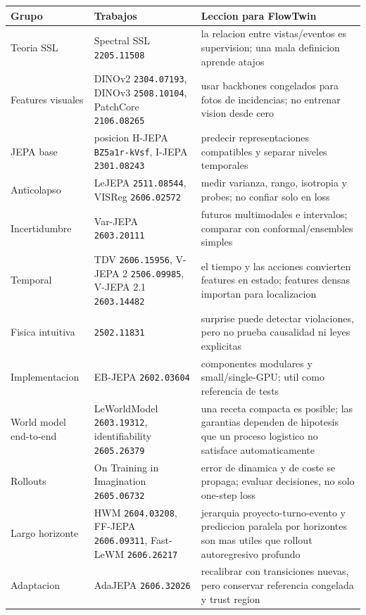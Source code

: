 \documentclass[
  spanish,
  10pt,
  a4paper,
]{article}
\newcounter{none} %
\begin{document}
{\def\LTcaptype{none} %
\begin{longtable}[]{@{}lll@{}}
\toprule\noalign{}
Grupo & Trabajos & Leccion para FlowTwin \\
\midrule\noalign{}
\endhead
\bottomrule\noalign{}
\endlastfoot
Teoria SSL & Spectral SSL \texttt{2205.11508} & la relacion entre
vistas/eventos es supervision; una mala definicion aprende atajos \\
Features visuales & DINOv2 \texttt{2304.07193}, DINOv3
\texttt{2508.10104}, PatchCore \texttt{2106.08265} & usar backbones
congelados para fotos de incidencias; no entrenar vision desde cero \\
JEPA base & posicion H-JEPA \texttt{BZ5a1r-kVsf}, I-JEPA
\texttt{2301.08243} & predecir representaciones compatibles y separar
niveles temporales \\
Anticolapso & LeJEPA \texttt{2511.08544}, VISReg \texttt{2606.02572} &
medir varianza, rango, isotropia y probes; no confiar solo en loss \\
Incertidumbre & Var-JEPA \texttt{2603.20111} & futuros multimodales e
intervalos; comparar con conformal/ensembles simples \\
Temporal & TDV \texttt{2606.15956}, V-JEPA 2 \texttt{2506.09985}, V-JEPA
2.1 \texttt{2603.14482} & el tiempo y las acciones convierten features
en estado; features densas importan para localizacion \\
Fisica intuitiva & \texttt{2502.11831} & surprise puede detectar
violaciones, pero no prueba causalidad ni leyes explicitas \\
Implementacion & EB-JEPA \texttt{2602.03604} & componentes modulares y
small/single-GPU; util como referencia de tests \\
World model end-to-end & LeWorldModel \texttt{2603.19312},
identifiability \texttt{2605.26379} & una receta compacta es posible;
las garantias dependen de hipotesis que un proceso logistico no
satisface automaticamente \\
Rollouts & On Training in Imagination \texttt{2605.06732} & error de
dinamica y de coste se propaga; evaluar decisiones, no solo one-step
loss \\
Largo horizonte & HWM \texttt{2604.03208}, FF-JEPA \texttt{2606.09311},
Fast-LeWM \texttt{2606.26217} & jerarquia proyecto-turno-evento y
prediccion paralela por horizontes son mas utiles que rollout
autoregresivo profundo \\
Adaptacion & AdaJEPA \texttt{2606.32026} & recalibrar con transiciones
nuevas, pero conservar referencia congelada y trust region \\

\end{longtable}}
\end{document}

